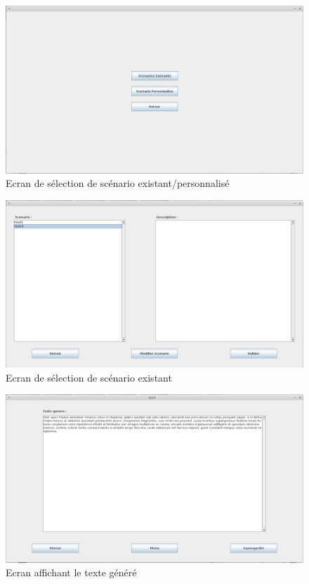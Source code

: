 \documentclass[12pt]{report}
\begin{document}
\begin{figure}
\centering
\includegraphics[scale=0.3]{IHM/choix_scenario.png}
\caption{Ecran de sélection de scénario existant/personnalisé}
\end{figure}
\begin{figure}
\centering
\includegraphics[scale=0.3]{IHM/selection_scenario.png}
\caption{Ecran de sélection de scénario existant}
\end{figure}
\begin{figure}
\centering
\includegraphics[scale=0.3]{IHM/affichage_resultat.png}
\caption{Ecran affichant le texte généré}
\end{figure}
\end{document}
